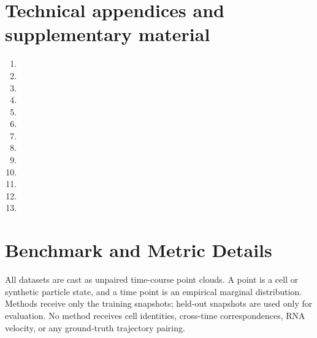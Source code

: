 \clearpage
\section*{Technical appendices and supplementary material}
\setcounter{figure}{0}
\setcounter{table}{0}
\renewcommand{\thefigure}{A.\arabic{figure}}
\renewcommand{\thetable}{A.\arabic{table}}
\renewcommand{\theHfigure}{appendix.\arabic{figure}}
\renewcommand{\theHtable}{appendix.\arabic{table}}
\begin{enumerate}[label=\Alph*.]
  \item {} \dotfill \pageref{sec:app:benchmarks}
  \item {} \dotfill \pageref{sec:app:baselines}
  \item {} \dotfill \pageref{sec:app:pace-implementation}
  \item {} \dotfill \pageref{app:illposed}
  \item {} \dotfill \pageref{app:metric-correspondence}
  \item {} \dotfill \pageref{app:optimization-monotonicity}
  \item {} \dotfill \pageref{app:regularizers}
  \item {} \dotfill \pageref{sec:app:concentration}
  \item {} \dotfill \pageref{sec:app:ipsc}
  \item {} \dotfill \pageref{app:alternating-intuition}
  \item {} \dotfill \pageref{app:adaptive-projectors}
  \item {} \dotfill \pageref{app:bandwidth}
  \item {} \dotfill \pageref{app:limitations}
\end{enumerate}

\vspace{1em}

\section{Benchmark and Metric Details}
\label{sec:app:benchmarks}

All datasets are cast as unpaired time-course point clouds. A point is a cell or synthetic particle state, and a time point is an empirical marginal distribution. Methods receive only the training snapshots; held-out snapshots are used only for evaluation. No method receives cell identities, cross-time correspondences, RNA velocity, or any ground-truth trajectory pairing.

